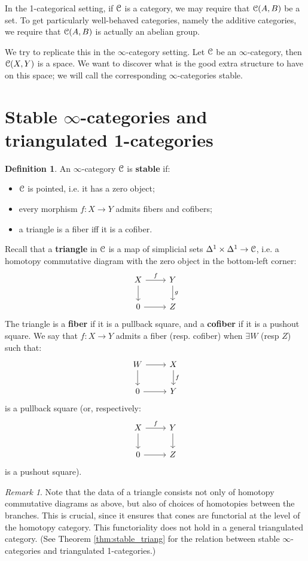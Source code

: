 \documentclass[10pt,a4paper,reqno,oneside]{book} %
\theoremstyle{plain}
\theoremstyle{definition}
\newtheorem{defin}[thm]{Definition}
\theoremstyle{remark}
\newtheorem{rem}[thm]{Remark}
\numberwithin{equation}{section}
\begin{document}
In the 1-categorical setting, if $\mathcal C$ is a category, we may require that $\mathcal C(A,B)$ be a set. 
To get particularly well-behaved categories, namely the additive categories, we require that $\mathcal C(A,B)$ is actually
an abelian group. 

We try to replicate this in the $\infty$-category setting.
Let $\mathcal C$ be an $\infty$-category, then $\mathcal C(X,Y)$ is a space. We want to discover what is the good extra structure to have on 
this space; we will call the corresponding $\infty$-categories stable.


\section{Stable $\infty$-categories and triangulated 1-categories}

\begin{defin}
An $\infty$-category $\mathcal C$ is \textbf{stable} if:
\begin{itemize}
\item $\mathcal C$ is pointed, i.e. it has a zero object;
\item every morphism $f : X \to Y$ admits fibers and cofibers;
\item a triangle is a fiber iff it is a cofiber.
\end{itemize}
\end{defin}

Recall that a \textbf{triangle} in $\mathcal C$ is a map of simplicial sets $\Delta^1 \times \Delta^1 \to \mathcal C$,
i.e. a homotopy commutative diagram with the zero object in the bottom-left corner:
\[
\begin{tikzcd}
X\arrow{r}{f}\arrow{d} & Y\arrow{d}{g} \\
0\arrow{r} & Z
\end{tikzcd}
\]
The triangle is a \textbf{fiber} if it is a pullback square, and a \textbf{cofiber} if it is a pushout square. We say
that $f: X \to Y$ admits a fiber (resp. cofiber) when $\exists W$ (resp $Z$) such that:
\[
\begin{tikzcd}
W\arrow{r}\arrow{d} & X\arrow{d}{f} \\
0\arrow{r} & Y
\end{tikzcd}
\]
is a pullback square (or, respectively:
\[
\begin{tikzcd}
X\arrow{r}{f}\arrow{d} & Y\arrow{d} \\
0\arrow{r} & Z
\end{tikzcd}
\]
is a pushout square).

\begin{rem}
Note that the data of a triangle consists not only of homotopy commutative diagrams as above, but also of choices of 
homotopies between the branches. This is crucial, since it ensures that cones are
functorial at the level of the homotopy category. This functoriality does not hold in a general triangulated category. 
(See Theorem \ref{thm:stable_triang} for the relation between stable
$\infty$-categories and triangulated 1-categories.)
\end{rem}
\end{document}
